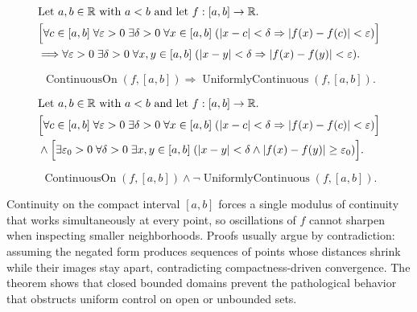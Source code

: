 \begin{remark*}
\[
\begin{aligned}
&\text{Let } a,b \in \mathbb{R} \text{ with } a<b \text{ and let } f:[a,b]\to\mathbb{R}.\\
&\Bigl[\forall c \in [a,b]\; \forall \varepsilon>0\; \exists \delta>0\; \forall x \in [a,b]\;(|x-c|<\delta \Rightarrow |f(x)-f(c)|<\varepsilon)\Bigr]\\
&\Longrightarrow \forall \varepsilon>0\; \exists \delta>0\; \forall x,y \in [a,b]\;(|x-y|<\delta \Rightarrow |f(x)-f(y)|<\varepsilon).
\end{aligned}
\]
\end{remark*}

\begin{remark*}
\[
\operatorname{ContinuousOn}(f,[a,b]) \Rightarrow \operatorname{UniformlyContinuous}(f,[a,b]).
\]
\end{remark*}

\begin{remark*}
\[
\begin{aligned}
&\text{Let } a,b \in \mathbb{R} \text{ with } a<b \text{ and let } f:[a,b]\to\mathbb{R}.\\
&\Bigl[\forall c \in [a,b]\; \forall \varepsilon>0\; \exists \delta>0\; \forall x \in [a,b]\;(|x-c|<\delta \Rightarrow |f(x)-f(c)|<\varepsilon)\Bigr]\\
&\land \Bigl[\exists \varepsilon_0>0\; \forall \delta>0\; \exists x,y \in [a,b]\;(|x-y|<\delta \land |f(x)-f(y)| \ge \varepsilon_0)\Bigr].
\end{aligned}
\]
\end{remark*}

\begin{remark*}
\[
\operatorname{ContinuousOn}(f,[a,b]) \land \neg \operatorname{UniformlyContinuous}(f,[a,b]).
\]
\end{remark*}

\begin{remark*}[Interpretation]
Continuity on the compact interval $[a,b]$ forces a single modulus of continuity that works simultaneously at every point, so oscillations of $f$ cannot sharpen when inspecting smaller neighborhoods. Proofs usually argue by contradiction: assuming the negated form produces sequences of points whose distances shrink while their images stay apart, contradicting compactness-driven convergence. The theorem shows that closed bounded domains prevent the pathological behavior that obstructs uniform control on open or unbounded sets.
\end{remark*}

